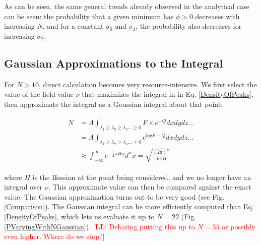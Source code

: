 \documentclass[12pt]{article}
\newcommand{\lfl}[1]{\textcolor{red}{[{\bf LL}: #1]}}
\begin{document}
As can be seen, the same general trends already observed in the analytical case can be seen: the probability that a given minimum has $\phi > 0$ decreases with increasing $N$, and for a constant $\sigma_0$ and $\sigma_1$, the probability also decreases for increasing $\sigma_2$.


\subsection{Gaussian Approximations to the Integral}
For $N>10$, direct calculation becomes very resource-intensive. We first select the value of the field value $\nu$ that maximizes the integral in in Eq. \ref{DensityOfPeaks}, then approximate the integral as a Gaussian integral about that point:

\begin{align*}
\begin{split}
N &= A \int_{\lambda_1 \geq \lambda_2 \geq \lambda_3 \ldots \geq 0} F \times e^{-Q} dx dy dz \ldots \\
&=A\int_{\lambda_1 \geq \lambda_2 \geq \lambda_3 \ldots \geq 0} e^{\mathrm{log}F-Q} dx dy dz \ldots \\
&\approx \int_{-\infty}^{\infty} e^{-\frac{1}{2}xHx} d^nx = \sqrt{\frac{(2\pi)^n}{\mathrm{det} H}}
\end{split}
\end{align*}

\noindent where $H$ is the Hessian at the point being considered, and we no longer have an integral over $\nu$. This approximate value can then be compared against the exact value. The Gaussian approximation turns out to be very good (see Fig. \ref{Comparison}). The Gaussian integral can be more efficiently computed than Eq. \ref{DensityOfPeaks}, which lets us evaluate it up to $N=22$ (Fig. \ref{PVaryingWithNGaussian}). \lfl{Debating putting this up to $N=35$ or possibly even higher. Where do we stop?}
\end{document}
